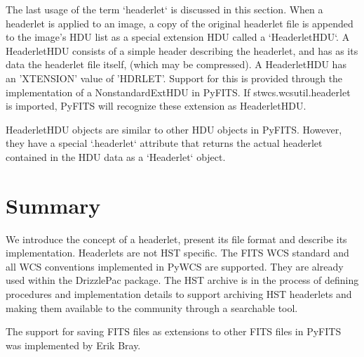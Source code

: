 The last usage of the term `headerlet` is discussed in this section.
When a headerlet is applied to an image, a copy of the original 
headerlet file is appended to the image's HDU list as a special extension
HDU called a `HeaderletHDU`. A HeaderletHDU consists of a simple header
describing the headerlet, and has as its data the headerlet file itself,
(which may be compressed). A HeaderletHDU has an 'XTENSION' 
value of 'HDRLET'. Support for this is provided through the implementation
of a NonstandardExtHDU in PyFITS. If stwcs.wcsutil.headerlet is imported,
PyFITS will recognize these extension as HeaderletHDU.

HeaderletHDU objects are similar to other HDU objects in PyFITS.
However, they have a special `.headerlet` attribute that returns
the actual headerlet contained in the HDU data as a `Headerlet` object.

\section{Summary}
We introduce the concept of a headerlet, present its file format
and describe its implementation. Headerlets are not HST specific.
The FITS WCS standard and all WCS conventions implemented in PyWCS
are supported. They are already used within the DrizzlePac package. 
The HST archive is in the process of defining procedures and 
implementation details to support archiving HST headerlets and making
them available to the community through a searchable tool.

\acknowledgements The support for saving FITS files as extensions to other FITS files in PyFITS was implemented by Erik Bray.


 
